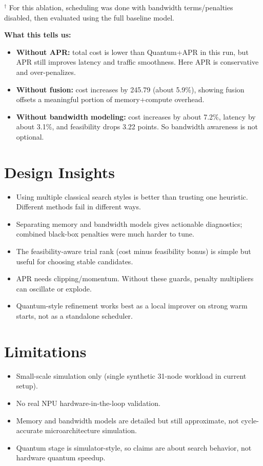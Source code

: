 \documentclass[11pt]{article}
\begin{document}
$^\dagger$ For this ablation, scheduling was done with bandwidth terms/penalties disabled, then evaluated using the full baseline model.

\textbf{What this tells us:}
\begin{itemize}
    \item \textbf{Without APR:} total cost is lower than Quantum+APR in this run, but APR still improves latency and traffic smoothness. Here APR is conservative and over-penalizes.
    \item \textbf{Without fusion:} cost increases by 245.79 (about 5.9\%), showing fusion offsets a meaningful portion of memory+compute overhead.
    \item \textbf{Without bandwidth modeling:} cost increases by about 7.2\%, latency by about 3.1\%, and feasibility drops 3.22 points. So bandwidth awareness is not optional.
\end{itemize}

\section{Design Insights}
\begin{itemize}
    \item Using multiple classical search styles is better than trusting one heuristic. Different methods fail in different ways.
    \item Separating memory and bandwidth models gives actionable diagnostics; combined black-box penalties were much harder to tune.
    \item The feasibility-aware trial rank (cost minus feasibility bonus) is simple but useful for choosing stable candidates.
    \item APR needs clipping/momentum. Without these guards, penalty multipliers can oscillate or explode.
    \item Quantum-style refinement works best as a local improver on strong warm starts, not as a standalone scheduler.
\end{itemize}

\section{Limitations}
\begin{itemize}
    \item Small-scale simulation only (single synthetic 31-node workload in current setup).
    \item No real NPU hardware-in-the-loop validation.
    \item Memory and bandwidth models are detailed but still approximate, not cycle-accurate microarchitecture simulation.
    \item Quantum stage is simulator-style, so claims are about search behavior, not hardware quantum speedup.
\end{itemize}
\end{document}
